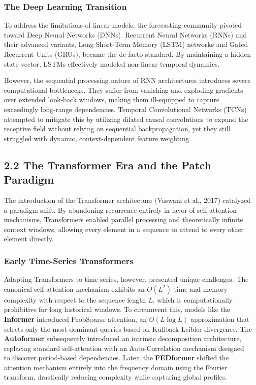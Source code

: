 \documentclass[11pt, letterpaper]{article}
\begin{document}
\subsubsection{The Deep Learning Transition}
To address the limitations of linear models, the forecasting community pivoted toward Deep Neural Networks (DNNs). Recurrent Neural Networks (RNNs) and their advanced variants, Long Short-Term Memory (LSTM) networks and Gated Recurrent Units (GRUs), became the de facto standard. By maintaining a hidden state vector, LSTMs effectively modeled non-linear temporal dynamics.

However, the sequential processing nature of RNN architectures introduces severe computational bottlenecks. They suffer from vanishing and exploding gradients over extended look-back windows, making them ill-equipped to capture exceedingly long-range dependencies. Temporal Convolutional Networks (TCNs) attempted to mitigate this by utilizing dilated causal convolutions to expand the receptive field without relying on sequential backpropagation, yet they still struggled with dynamic, context-dependent feature weighting.

\subsection{2.2 The Transformer Era and the Patch Paradigm}

The introduction of the Transformer architecture (Vaswani et al., 2017) catalyzed a paradigm shift. By abandoning recurrence entirely in favor of self-attention mechanisms, Transformers enabled parallel processing and theoretically infinite context windows, allowing every element in a sequence to attend to every other element directly.

\subsubsection{Early Time-Series Transformers}
Adapting Transformers to time series, however, presented unique challenges. The canonical self-attention mechanism exhibits an $O(L^2)$ time and memory complexity with respect to the sequence length $L$, which is computationally prohibitive for long historical windows. To circumvent this, models like the \textbf{Informer} introduced ProbSparse attention, an $O(L \log L)$ approximation that selects only the most dominant queries based on Kullback-Leibler divergence. The \textbf{Autoformer} subsequently introduced an intrinsic decomposition architecture, replacing standard self-attention with an Auto-Correlation mechanism designed to discover period-based dependencies. Later, the \textbf{FEDformer} shifted the attention mechanism entirely into the frequency domain using the Fourier transform, drastically reducing complexity while capturing global profiles.
\end{document}
